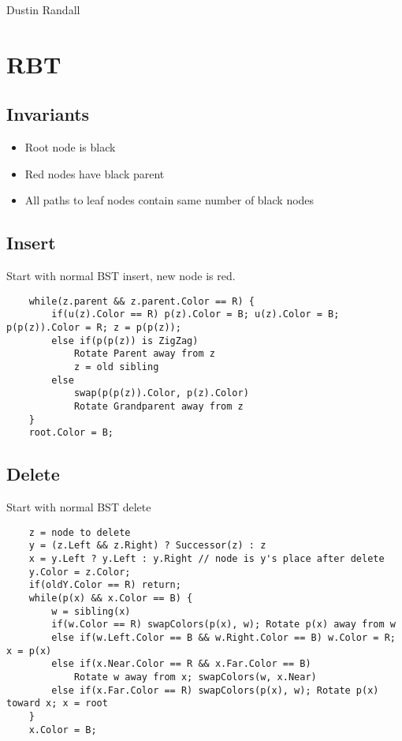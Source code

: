 \documentclass{article}
\begin{document}
Dustin Randall \\

\section{RBT}
\subsection{Invariants}
\begin{itemize}
    \item Root node is black
    \item Red nodes have black parent
    \item All paths to leaf nodes contain same number of black nodes
\end{itemize}
\subsection{Insert}
Start with normal BST insert, new node is red.
\begin{lstlisting}
    while(z.parent && z.parent.Color == R) {
        if(u(z).Color == R) p(z).Color = B; u(z).Color = B; p(p(z)).Color = R; z = p(p(z));
        else if(p(p(z)) is ZigZag)
            Rotate Parent away from z
            z = old sibling
        else
            swap(p(p(z)).Color, p(z).Color)
            Rotate Grandparent away from z
    }
    root.Color = B;
\end{lstlisting}

\subsection{Delete}
Start with normal BST delete
\begin{lstlisting}
    z = node to delete
    y = (z.Left && z.Right) ? Successor(z) : z
    x = y.Left ? y.Left : y.Right // node is y's place after delete
    y.Color = z.Color;
    if(oldY.Color == R) return;
    while(p(x) && x.Color == B) {
        w = sibling(x)
        if(w.Color == R) swapColors(p(x), w); Rotate p(x) away from w
        else if(w.Left.Color == B && w.Right.Color == B) w.Color = R; x = p(x)
        else if(x.Near.Color == R && x.Far.Color == B) 
            Rotate w away from x; swapColors(w, x.Near)
        else if(x.Far.Color == R) swapColors(p(x), w); Rotate p(x) toward x; x = root
    }
    x.Color = B;
\end{lstlisting}
\end{document}
